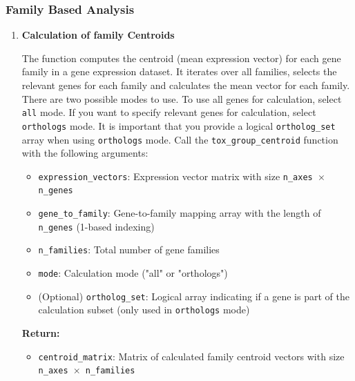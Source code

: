 \subsubsection{Family Based Analysis}
\begin{enumerate}
    \item \textbf{Calculation of family Centroids}
          
          The function computes the centroid (mean expression vector) for each gene family
          in a gene expression dataset. It iterates over all families, selects the relevant
          genes for each family and calculates the mean vector for each family.
          There are two possible modes to use. To use all genes for calculation,
          select \texttt{all} mode. If you want to specify relevant genes for
          calculation, select \texttt{orthologs} mode. It is important that you provide
          a logical \texttt{ortholog\_set} array when using \texttt{orthologs} mode.
          Call the \texttt{tox\_group\_centroid} function with the following arguments:
          
          \begin{itemize}
            \item \texttt{expression\_vectors}: Expression vector matrix with size \texttt{n\_axes
                  $\times$ n\_genes}
            
            \item \texttt{gene\_to\_family}: Gene-to-family mapping array with the length
                  of \texttt{n\_genes} (1-based indexing)
                  
            \item \texttt{n\_families}: Total number of gene families
                  
            \item \texttt{mode}: Calculation mode ("all" or "orthologs")
                  
            \item (Optional) \texttt{ortholog\_set}: Logical array indicating if a gene
                  is part of the calculation subset (only used in \texttt{orthologs} mode)
          \end{itemize}
          
          \textbf{Return:}
          \begin{itemize}
            \item \texttt{centroid\_matrix}: Matrix of calculated family centroid vectors
                  with size \texttt{n\_axes $\times$ n\_families}
          \end{itemize}
          

\end{enumerate}
